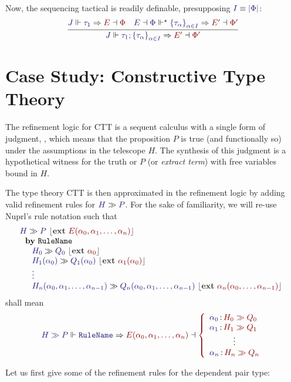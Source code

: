 \documentclass[11pt]{article}
\theoremstyle{definition}
\theoremstyle{remark}
\numberwithin{equation}{section}
\def\IModeColorName{MidnightBlue}
\def\OModeColorName{Maroon}
\newcommand\IMode[1]{{\color{\IModeColorName}{#1}}}
\newcommand\OMode[1]{{\color{\OModeColorName}{#1}}}
\newcommand\JJ{J}
\newcommand\MkSet[1]{\left\{#1\right\}}
\newcommand\MkFam[3]{\MkSet{#1_{#2}}_{#2\in #3}}
\newcommand\OSG[2]{\IMode{#1}\,{\color{Black}:}\,\OMode{#2}}
\newcommand\Refine[4]{\IMode{#1}\Vdash\IMode{#2}\Rightarrow\OMode{#4}\dashv\OMode{#3}}
\newcommand\ThenMultiAux[5]{%
  \IMode{#2}\dashv\IMode{#3}%
  \Vdash^\star\IMode{#1}\Rightarrow%
  \OMode{#4}\dashv\OMode{#5}%
}
\newcommand\ThenTac[2]{#1;#2}
\newcommand\Dom[1]{\left\vert#1\right\vert}
\newcommand\IsEquiv[2]{\IMode{#1}\equiv\IMode{#2}}
\newcommand\Seq[2]{#1 \gg #2}
\newcommand\Ext[1]{{\color{dark-gray}\left\lfloor\mathbf{ext}\ \OMode{#1}\right\rfloor}}
\newcommand\SeqExt[3]{
  \Seq{\IMode{#1}}{\IMode{#2}}\ \Ext{#3}
}
\newcommand\NuprlRule[3]{%
  \begin{array}{l}%
    #2\\
    \ \ \mathbf{by}\ #1\\
    \quad #3
  \end{array}%
}
\begin{document}
Now, the sequencing tactical is readily definable, presupposing $\IsEquiv{I}{\Dom\Phi}$:
\[
  \infer{
    \Refine{\JJ}{\ThenTac{\tau_1}{\MkFam{\tau}{\alpha}{I}}}{\Phi'}{E'}
  }{
    \Refine{\JJ}{\tau_1}{\Phi}{E} &
    \ThenMultiAux{
      \MkFam{\tau}{\alpha}{I}
    }{E}{\Phi}{E'}{\Phi'}
  }
\]

\section{Case Study: Constructive Type Theory}


The refinement logic for CTT is a sequent calculus with a single form of
judgment, \framebox{$\Seq{\IMode{H}}{\IMode{P}}$}, which means that the
proposition $P$ is true (and functionally so) under the assumptions in the
telescope $H$. The synthesis of this judgment is a hypothetical witness for the
truth or $P$ (or \emph{extract term}) with free variables bound in $H$.

The type theory CTT is then approximated in the refinement logic by adding
valid refinement rules for $\Seq{\IMode{H}}{\IMode{P}}$. For the sake of
familiarity, we will re-use Nuprl's rule notation such that
\[
  \NuprlRule{\texttt{RuleName}}{
    \SeqExt{H}{P}{E(\alpha_0,\alpha_1,\dots,\alpha_n)}
  }{
    \begin{array}{l}
      \SeqExt{H_0}{Q_0}{\alpha_0}\\
      \SeqExt{H_1(\alpha_0)}{Q_1(\alpha_0)}{\alpha_1(\alpha_0)}\\
      \vdots\\
      \SeqExt{H_n(\alpha_0,\alpha_1,\dots,\alpha_{n-1})}{Q_n(\alpha_0,\alpha_1,\dots,\alpha_{n-1})}{\alpha_n(\alpha_0,\dots,\alpha_{n-1})}
    \end{array}
  }
\]
shall mean
\[
  \Refine{
    \Seq{H}{P}
  }{
    \mathtt{RuleName}
  }{
    \left\{\begin{array}{l}
      \OSG{\alpha_0}{\Seq{H_0}{Q_0}}\\
      \OSG{\alpha_1}{\Seq{H_1}{Q_1}}\\
      \multicolumn{1}{c}{\color{Black}\vdots}\\
      \OSG{\alpha_n}{\Seq{H_n}{Q_n}}\\
    \end{array}\right.
  }{
    E(\alpha_0,\alpha_1,\dots,\alpha_n)
  }
\]


Let us first give some of the refinement rules for the dependent pair type:
\end{document}
